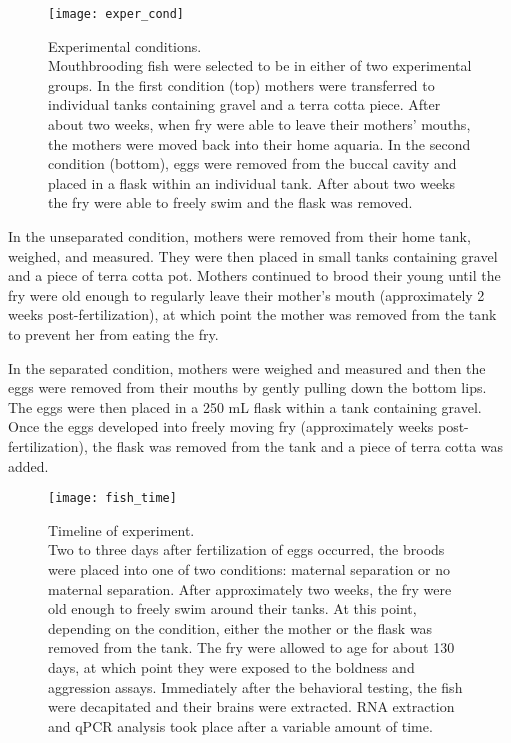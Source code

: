 \documentclass[12pt,twoside]{reedthesis}
\begin{document}
\begin{figure}[htbp] 
\begin{centering} 
\texttt{[image: exper\_cond]}
\caption[Experimental conditions]{\footnotesize{Experimental conditions.\\
    Mouthbrooding fish were selected to be in either of two experimental groups.
  In the first condition (top) mothers were transferred to individual tanks
  containing gravel and a terra cotta piece. After about two weeks, when fry were
able to leave their mothers' mouths, the mothers were moved back into their home
aquaria. In the second condition (bottom), eggs were removed from the buccal
cavity and placed in a flask within an individual tank. After about two weeks
the fry were able to freely swim and the flask was removed.}} 
\label{subd}
\end{centering} 
\end{figure}

In the unseparated condition, mothers were removed from their home tank,
weighed, and measured. They were then placed in small tanks containing gravel
and a piece of terra cotta pot. Mothers continued to brood their young until the
fry were old enough to regularly leave their mother's mouth (approximately 2 weeks post-fertilization), at which point the mother was removed from the tank to prevent her from eating the fry. 

In the separated condition, mothers were weighed and measured and then the eggs
were removed from their mouths by gently pulling down the bottom
lips. The eggs were then placed in a 250 mL flask within a tank containing gravel. Once
the eggs developed into freely moving fry (approximately weeks post-fertilization), the flask was removed from the tank and a piece of terra cotta was added.

\begin{figure}[htbp] 
\begin{centering} 
\texttt{[image: fish\_time]}
\caption[Timeline of experiment]{\footnotesize{Timeline of experiment.\\ Two to
    three days after fertilization of eggs occurred, the broods were placed into
  one of two conditions: maternal separation or no maternal separation. After
  approximately two weeks, the fry were old enough to freely swim around their
  tanks. At this point, depending on the condition, either the mother or the
  flask was removed from the tank. The fry were allowed to age for about 130
  days, at which point they were exposed to the boldness and aggression assays.
  Immediately after the behavioral testing, the fish were decapitated and their
  brains were extracted. RNA extraction and qPCR analysis took place after a variable
  amount of time.}} 
\label{subd}
\end{centering} 
\end{figure}
\end{document}
